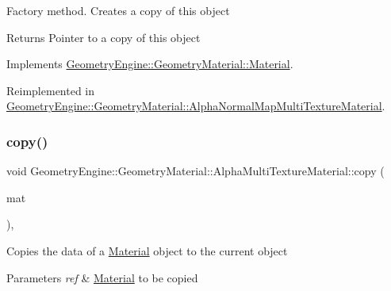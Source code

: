 Factory method. Creates a copy of this object \begin{DoxyReturn}{Returns}
Pointer to a copy of this object 
\end{DoxyReturn}


Implements \mbox{\hyperlink{class_geometry_engine_1_1_geometry_material_1_1_material_ae5513ff06d536365e18ddc5e07e79784}{Geometry\+Engine\+::\+Geometry\+Material\+::\+Material}}.



Reimplemented in \mbox{\hyperlink{class_geometry_engine_1_1_geometry_material_1_1_alpha_normal_map_multi_texture_material_afa328c24595fe1456e87db7ad6df2759}{Geometry\+Engine\+::\+Geometry\+Material\+::\+Alpha\+Normal\+Map\+Multi\+Texture\+Material}}.

\mbox{\label{class_geometry_engine_1_1_geometry_material_1_1_alpha_multi_texture_material_a98e22afaa7a3b015815d00dbc4daf9ce}} 
\subsubsection{\texorpdfstring{copy()}{copy()}}
{\footnotesize\ttfamily void Geometry\+Engine\+::\+Geometry\+Material\+::\+Alpha\+Multi\+Texture\+Material\+::copy (\begin{DoxyParamCaption}\item[{const \mbox{\hyperlink{class_geometry_engine_1_1_geometry_material_1_1_alpha_multi_texture_material}{Alpha\+Multi\+Texture\+Material}} \&}]{mat }\end{DoxyParamCaption})\hspace{0.3cm}{\ttfamily [protected]}, {\ttfamily [virtual]}}

Copies the data of a \mbox{\hyperlink{class_geometry_engine_1_1_geometry_material_1_1_material}{Material}} object to the current object 
\begin{DoxyParams}{Parameters}
{\em ref} & \mbox{\hyperlink{class_geometry_engine_1_1_geometry_material_1_1_material}{Material}} to be copied \\
\hline
\end{DoxyParams}
\mbox{\label{class_geometry_engine_1_1_geometry_material_1_1_alpha_multi_texture_material_a1ccf4b07be9fe240d521345eb5312a79}} 
